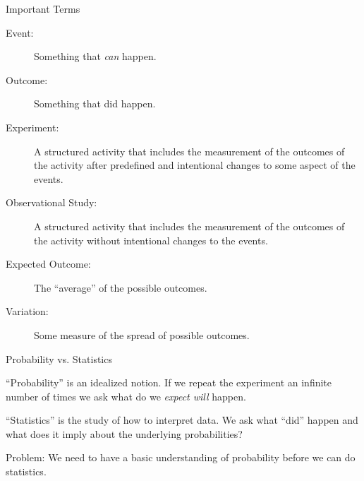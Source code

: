 \begin{frame}{Important Terms}

  \begin{description}
  \item[Event:] Something that \textit{can} happen.
  \item[Outcome:] Something that did happen.
  \item[Experiment:] A structured activity that includes the
    measurement of the outcomes of the activity after predefined and
    intentional changes to some aspect of the events.
  \item[Observational Study:] A structured activity that includes the
    measurement of the outcomes of the activity without intentional
    changes to the events.
  \item[Expected Outcome:] The ``average'' of the possible outcomes.
  \item[Variation:] Some measure of the spread of possible outcomes.
  \end{description}
  
\end{frame}

\begin{frame}{Probability vs. Statistics}

  ``Probability'' is an idealized notion. If we repeat the experiment
  an infinite number of times we ask what do we \textit{expect will} happen.

  \vfill

  ``Statistics'' is the study of how to interpret data. We ask what
  ``did'' happen and what does it imply about the underlying
  probabilities?

  \vfill

  {

    Problem: We need to have a basic understanding of probability
    before we can do statistics.

  }
  
\end{frame}

